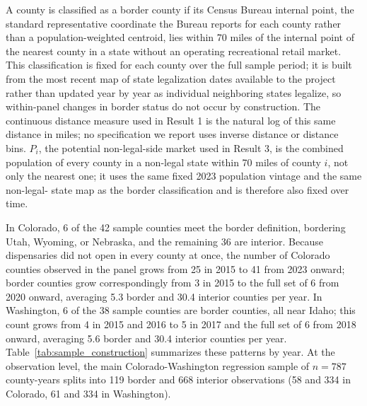 \documentclass[12pt]{article}
\begin{document}
A county is classified as a border county if its Census Bureau internal point, the standard representative
coordinate the Bureau reports for each county rather than a population-weighted centroid, lies within 70
miles of the internal point of the nearest county in a state without an operating recreational retail
market. This classification is fixed for each county over the full sample period; it is built from the most
recent map of state legalization dates available to the project rather than updated year by year as
individual neighboring states legalize, so within-panel changes in border status do not occur by
construction. The continuous distance measure used in Result 1 is the natural log of this same distance in
miles; no specification we report uses inverse distance or distance bins. $P_i$, the potential non-legal-side
market used in Result 3, is the combined population of every county in a non-legal state within 70 miles of
county $i$, not only the nearest one; it uses the same fixed 2023 population vintage and the same non-legal-
state map as the border classification and is therefore also fixed over time.

In Colorado, 6 of the 42 sample counties meet the border definition, bordering Utah, Wyoming, or Nebraska,
and the remaining 36 are interior. Because dispensaries did not open in every county at once, the number of
Colorado counties observed in the panel grows from 25 in 2015 to 41 from 2023 onward; border counties grow
correspondingly from 3 in 2015 to the full set of 6 from 2020 onward, averaging 5.3 border and 30.4 interior
counties per year. In Washington, 6 of the 38 sample counties are border counties, all near Idaho; this count
grows from 4 in 2015 and 2016 to 5 in 2017 and the full set of 6 from 2018 onward, averaging 5.6 border and
30.4 interior counties per year. Table~\ref{tab:sample_construction} summarizes these patterns by year. At
the observation level, the main Colorado-Washington regression sample of $n=787$ county-years splits into
119 border and 668 interior observations (58 and 334 in Colorado, 61 and 334 in Washington).
\end{document}
